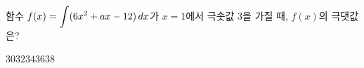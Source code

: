 함수 $f(x)=\displaystyle\int (6x^2+ax-12)\mkern3mu dx$가 $x=1$에서 극솟값 $3$을 가질 때, $f(x)$의 극댓값은? 
\begin{choices32}{$30$}{$32$}{$34$}{$36$}{$38$}\end{choices32}

